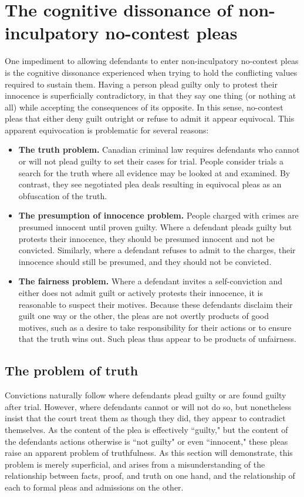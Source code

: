 \section{The cognitive dissonance of non-inculpatory no-contest pleas}

One impediment to allowing defendants to enter non-inculpatory no-contest pleas is the cognitive dissonance experienced when trying to hold the conflicting values required to sustain them. Having a person plead guilty only to protest their innocence is superficially contradictory, in that they say one thing (or nothing at all) while accepting the consequences of its opposite. In this sense, no-contest pleas that either deny guilt outright or refuse to admit it appear equivocal. This apparent equivocation is problematic for several reasons:

\begin{itemize}
    \item \textbf{The truth problem.} Canadian criminal law requires defendants who cannot or will not plead guilty to set their cases for trial. People consider trials a search for the truth where all evidence may be looked at and examined. By contrast, they see negotiated plea deals resulting in equivocal pleas as an obfuscation of the truth.
    \item \textbf{The presumption of innocence problem.} People charged with crimes are presumed innocent until proven guilty. Where a defendant pleads guilty but protests their innocence, they should be presumed innocent and not be convicted. Similarly, where a defendant refuses to admit to the charges, their innocence should still be presumed, and they should not be convicted.
    \item \textbf{The fairness problem.} Where a defendant invites a self-conviction and either does not admit guilt or actively protests their innocence, it is reasonable to suspect their motives. Because these defendants disclaim their guilt one way or the other, the pleas are not overtly products of good motives, such as a desire to take responsibility for their actions or to ensure that the truth wins out. Such pleas thus appear to be products of unfairness. 
\end{itemize}

\subsection{The problem of truth}

Convictions naturally follow where defendants plead guilty or are found guilty after trial. However, where defendants cannot or will not do so, but nonetheless insist that the court treat them as though they did, they appear to contradict themselves. As the content of the plea is effectively ``guilty," but the content of the defendants actions otherwise is ``not guilty" or even ``innocent," these pleas raise an apparent problem of truthfulness. As this section will demonstrate, this problem is merely superficial, and arises from a misunderstanding of the relationship between facts, proof, and truth on one hand, and the relationship of each to formal pleas and admissions on the other.


